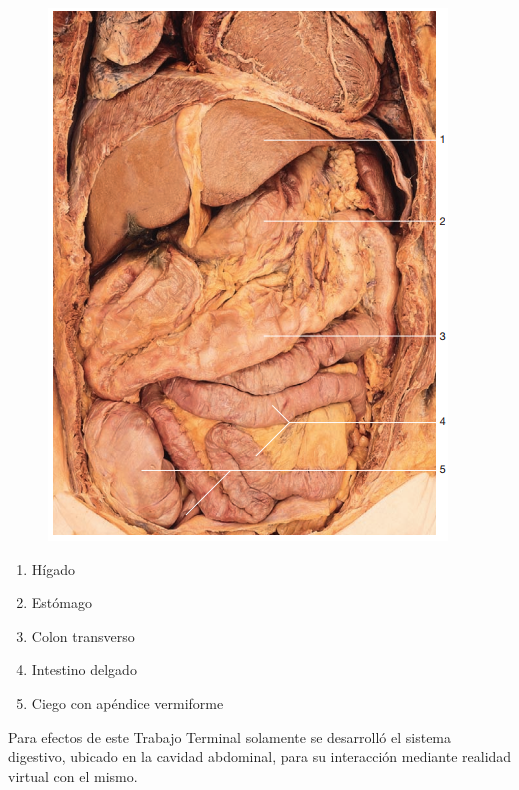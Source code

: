\begin{figure}[H]
	\begin{center}
 		\includegraphics[width = .3\textwidth]{source/images/image72.png}
	\end{center} 
\end{figure}
\begin{enumerate}
  \item Hígado
  \item Estómago
  \item Colon transverso
  \item Intestino delgado
  \item Ciego con apéndice vermiforme
\end{enumerate}
Para efectos de este Trabajo Terminal solamente se desarrolló el sistema digestivo, ubicado en la cavidad abdominal, para su interacción mediante realidad virtual con el mismo.\\
